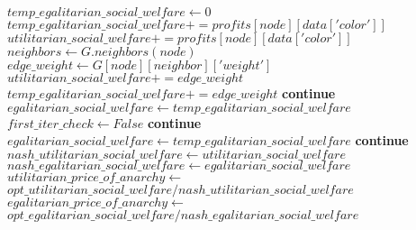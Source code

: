 \begin{algorithmic}
		\State $temp\_egalitarian\_social\_welfare\gets 0$
		\State $temp\_egalitarian\_social\_welfare += profits[node][data['color']]$
		\State $utilitarian\_social\_welfare += profits[node][data['color']]$
		\State $neighbors\gets G.neighbors(node)$
				\State $edge\_weight\gets G[node][neighbor]['weight']$
				\State $utilitarian\_social\_welfare += edge\_weight$
				\State $temp\_egalitarian\_social\_welfare += edge\_weight$
			\Else
				\State \textbf{continue}
			\EndIf
				\State $egalitarian\_social\_welfare\gets temp\_egalitarian\_social\_welfare$
				\State $first\_iter\_check\gets False$
				\State \textbf{continue}
			\EndIf
				\State $egalitarian\_social\_welfare\gets temp\_egalitarian\_social\_welfare$
			\Else
				\State \textbf{continue}
			\EndIf
		\EndFor
	\EndFor \\

	\State $nash\_utilitarian\_social\_welfare\gets utilitarian\_social\_welfare$
	\State $nash\_egalitarian\_social\_welfare\gets egalitarian\_social\_welfare$ \\

		\State $utilitarian\_price\_of\_anarchy\gets$ \\
		$opt\_utilitarian\_social\_welfare / nash\_utilitarian\_social\_welfare$
	\EndIf
		\State $egalitarian\_price\_of\_anarchy\gets$ \\
		$opt\_egalitarian\_social\_welfare / nash\_egalitarian\_social\_welfare$
	\EndIf \\
\EndIf 

\end{algorithmic}

